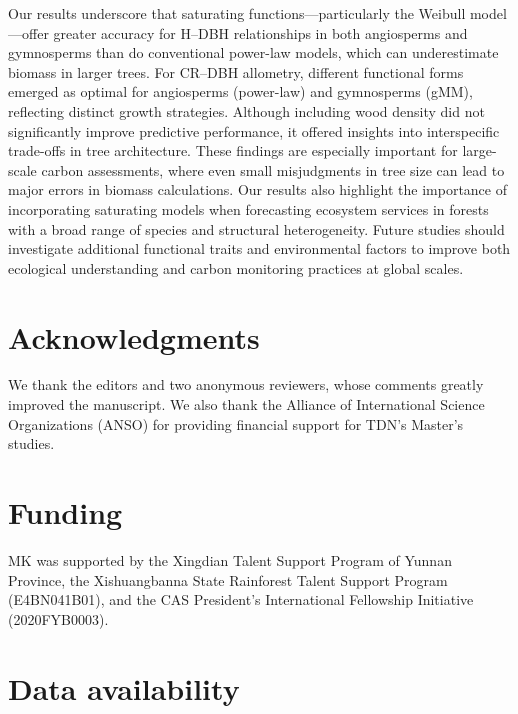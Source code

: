 \documentclass[
  12pt,
  letterpaper,
  DIV=11,
  numbers=noendperiod]{scrartcl}
\begin{document}
Our results underscore that saturating functions---particularly the
Weibull model---offer greater accuracy for H--DBH relationships in both
angiosperms and gymnosperms than do conventional power-law models, which
can underestimate biomass in larger trees. For CR--DBH allometry,
different functional forms emerged as optimal for angiosperms
(power-law) and gymnosperms (gMM), reflecting distinct growth
strategies. Although including wood density did not significantly
improve predictive performance, it offered insights into interspecific
trade-offs in tree architecture. These findings are especially important
for large-scale carbon assessments, where even small misjudgments in
tree size can lead to major errors in biomass calculations. Our results
also highlight the importance of incorporating saturating models when
forecasting ecosystem services in forests with a broad range of species
and structural heterogeneity. Future studies should investigate
additional functional traits and environmental factors to improve both
ecological understanding and carbon monitoring practices at global
scales.

\newpage

\hypertarget{acknowledgments}{%
\section*{Acknowledgments}\label{acknowledgments}}

We thank the editors and two anonymous reviewers, whose comments greatly
improved the manuscript. We also thank the Alliance of International
Science Organizations (ANSO) for providing financial support for TDN's
Master's studies.

\hypertarget{funding}{%
\section*{Funding}\label{funding}}

MK was supported by the Xingdian Talent Support Program of Yunnan
Province, the Xishuangbanna State Rainforest Talent Support Program
(E4BN041B01), and the CAS President's International Fellowship
Initiative (2020FYB0003).

\hypertarget{data-availability}{%
\section*{Data availability}\label{data-availability}}
\end{document}
